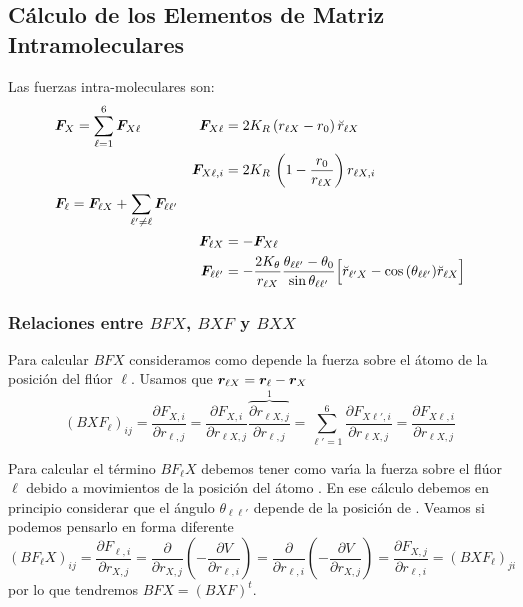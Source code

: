 \subsection{C\'{a}lculo de los Elementos de Matriz Intramoleculares}
\label{S:calculo-elementos}

Las fuerzas intra-moleculares son:
%
\begin{subequations}
  \begin{align}\label{Q:F-sobre-X}
    &  \bm{F}_{X} = \sum_{\ell=1}^{6}\bm{F}_{X\ell} & 
                                                          \bm{F}_{X\ell} &=  2 K_{R} \, (r_{\ell X}- r_{0})\, \breve{r}_{\ell X}  \\
    & &  \bm{F}_{X\ell,i} &= 2 K_{R} \, \left( 1-\frac{r_{0}}{r_{\ell X}} \right) r_{\ell X,i}  \nonumber\\
    \label{Q:F-Sobre-Fl}
    &\bm{F}_{\ell} =   \bm{F}_{\ell X} + \sum_{\ell' \ne \ell} \bm{F}_{\ell \ell'} & \\
    &  & \bm{F}_{\ell X} &= -  \bm{F}_{X\ell} \nonumber \\
    & & \bm{F}_{\ell \ell'} &= -\frac{2 K_{\theta}}{r_{\ell X}} \frac{\theta_{\ell\ell'}-\theta_{0}}{\sin \theta_{\ell\ell'}} \Big[ \breve{r}_{\ell' X} - \cos{(\theta_{\ell\ell'})} \breve{r}_{\ell X} \Big] \nonumber
  \end{align}
\end{subequations}


\subsubsection{Relaciones entre $BFX$, $BXF$ y $BXX$}
Para calcular $BFX$ consideramos como depende la fuerza sobre el \'{a}tomo   de la posici\'{o}n del fl\'{u}or $\ell$. 
Usamos que $\bm{r}_{\ell X} = \bm{r}_{\ell} - \bm{r}_{X}$
\begin{equation}
  \label{Q:BXF-1}
  (BXF_{\ell})_{ij} = \frac{\partial F_{X,i}}{\partial r_{\ell,j}} = \frac{\partial F_{X,i}}{\partial r_{\ell X,j}} \overbrace{\frac{\partial r_{\ell X,j}}{\partial r_{\ell,j}}}^{1} = \sum_{\ell'=1}^{6} \frac{\partial F_{X\ell',i}}{\partial r_{\ell X,j}} = \frac{\partial F_{X\ell,i}}{\partial r_{\ell X,j}}
\end{equation}

Para calcular el t\'{e}rmino $BF_{\ell}X$ debemos tener como var\'{\i}a la fuerza sobre el fl\'{u}or $\ell$ debido a movimientos de la posici\'{o}n del \'{a}tomo . En ese c\'{a}lculo debemos en principio considerar que el \'{a}ngulo $\theta_{\ell \ell'} $ depende de la posici\'{o}n de .
Veamos si podemos pensarlo en forma diferente
\begin{equation}
  \label{Q:BFX-1}
  (BF_{\ell}X)_{ij} = \frac{\partial F_{\ell,i}}{\partial r_{X,j}} = \frac{\partial}{\partial r_{X,j}} \left(- \frac{\partial V}{\partial r_{\ell,i}}  \right) =
 \frac{\partial}{\partial r_{\ell,i}} \left(- \frac{\partial V}{\partial r_{X,j}}  \right) =  \frac{\partial F_{X,j}}{\partial r_{\ell,i}} = (BXF_{\ell})_{ji}
\end{equation}
por lo que tendremos $BFX=(BXF)^{t}$.

